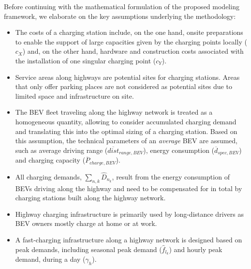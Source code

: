 \documentclass[journal,article,submit,pdftex,moreauthors]{Definitions/mdpi}
\begin{document}
Before continuing with the mathematical formulation of the proposed modeling framework, we elaborate on the key assumptions underlying the methodology:  

\begin{itemize}

     \item The costs of a charging station include, on the one hand, onsite preparations to enable the support of large capacities given by the charging points locally ($c_X$) and, on the other hand, hardware and construction costs associated with the installation of one singular charging point ($c_Y$).
     
      \item Service areas along highways are potential sites for charging stations. Areas that only offer parking places are not considered as potential sites due to limited space and infrastructure on site.
     
     \item The BEV fleet traveling along the highway network is treated as a homogeneous quantity, allowing to consider accumulated charging demand and translating this into the optimal sizing of a charging station. Based on this assumption, the technical parameters of an \textit{average} BEV are assumed, such as average driving range ($\overline{dist}_{range, BEV}$), energy consumption ($\overline{d}_{spec, BEV}$) and charging capacity ($\overline{P}_{charge,BEV}$).
 
    \item All charging demands, $\sum_{n, k}\hat{D}_{n_k}$, result from the energy consumption of BEVs driving along the highway and need to be compensated for in total by charging stations built along the highway network.

    \item Highway charging infrastructure is primarily used by long-distance drivers as BEV owners mostly charge at home or at work. 

    \item A fast-charging infrastructure along a highway network is designed based on peak demands, including seasonal peak demand ($\hat{f}_{l_k}$) and hourly peak demand, during a day ($\gamma_h$).
      
   
   
\end{itemize}
\end{document}
